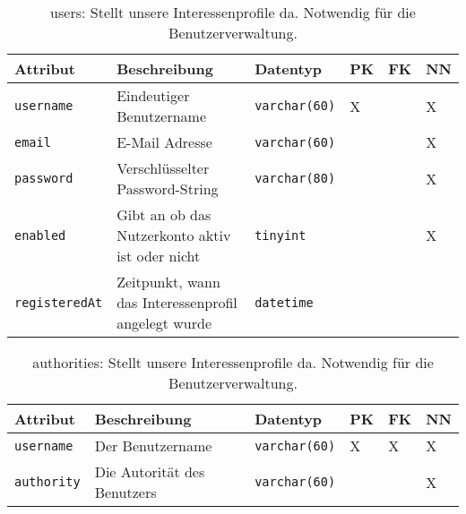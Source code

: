 \begin{table}[!ht]
	\caption{users: Stellt unsere Interessenprofile da. Notwendig für die Benutzerverwaltung.}
    \begin{tabular}{p{3cm}p{5cm}p{2cm}p{1cm}p{1cm}p{1cm}}
    \toprule 
    \textbf{Attribut} & \textbf{Beschreibung} & \textbf{Datentyp} & \textbf{PK} & \textbf{FK} & \textbf{NN} \\
    \hline 
    \texttt{username} & Eindeutiger Benutzername & \texttt{varchar(60)} & X && X   \\
    \texttt{email} &  E-Mail Adresse  & \texttt{varchar(60)} & & & X   \\
    \texttt{password} &  Verschlüsselter Password-String & \texttt{varchar(80)} & & & X  \\
    \texttt{enabled} & Gibt an ob das Nutzerkonto aktiv ist oder nicht   & \texttt{tinyint} & & & X \\
    \texttt{registeredAt} & Zeitpunkt, wann das Interessenprofil angelegt wurde & \texttt{datetime} & & &   \\
   	\bottomrule
  \end{tabular}
\end{table}

\begin{table}[!ht]
	\caption{authorities: Stellt unsere Interessenprofile da. Notwendig für die Benutzerverwaltung.}
	\begin{tabular}{p{3cm}p{5cm}p{2cm}p{1cm}p{1cm}p{1cm}}
	\toprule 
	\textbf{Attribut} & \textbf{Beschreibung} & \textbf{Datentyp} & \textbf{PK} & \textbf{FK} & \textbf{NN} \\
	\hline 
	\texttt{username} & Der Benutzername &\texttt{varchar(60)} & X & X & X   \\
	\texttt{authority} & Die Autorität des Benutzers & \texttt{varchar(60)} & & & X   \\
	\bottomrule
	\end{tabular}
\end{table}


